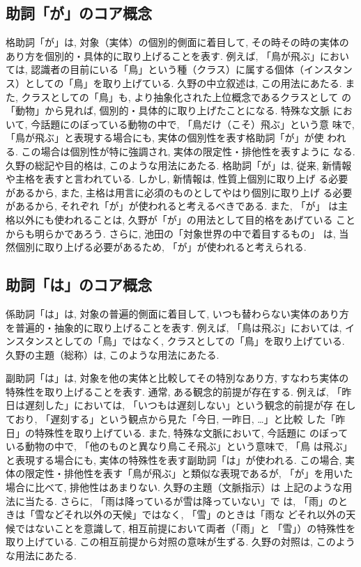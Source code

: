 \subsection{助詞「が」のコア概念}
格助詞「が」は, 対象（実体）の個別的側面に着目して, その時その時の実体の
あり方を個別的・具体的に取り上げることを表す. 例えば, 「鳥が飛ぶ」におい
ては, 認識者の目前にいる「鳥」という種（クラス）に属する個体（インスタン
ス）としての「鳥」を取り上げている. 久野の中立叙述は, この用法にあたる. 
また, クラスとしての「鳥」も, より抽象化された上位概念であるクラスとして
の「動物」から見れば, 個別的・具体的に取り上げたことになる. 特殊な文脈
において, 今話題にのぼっている動物の中で, 「鳥だけ（こそ）飛ぶ」という意
味で, 「鳥が飛ぶ」と表現する場合にも, 実体の個別性を表す格助詞「が」が使
われる. この場合は個別性が特に強調され, 実体の限定性・排他性を表すように
なる. 久野の総記や目的格は, このような用法にあたる. 格助詞「が」は, 従来, 
新情報や主格を表すと言われている. しかし, 新情報は, 性質上個別に取り上げ
る必要があるから, また, 主格は用言に必須のものとしてやはり個別に取り上げ
る必要があるから, それぞれ「が」が使われると考えるべきである. また, 「が」
は主格以外にも使われることは, 久野が「が」の用法として目的格をあげている
ことからも明らかであろう. さらに, 池田の「対象世界の中で着目するもの」
は, 当然個別に取り上げる必要があるため, 「が」が使われると考えられる. 

\subsection{助詞「は」のコア概念}
係助詞「は」は, 対象の普遍的側面に着目して, いつも替わらない実体のあり方
を普遍的・抽象的に取り上げることを表す. 例えば, 「鳥は飛ぶ」においては, 
インスタンスとしての「鳥」ではなく, クラスとしての「鳥」を取り上げている. 
久野の主題（総称）は, このような用法にあたる. 

副助詞「は」は, 対象を他の実体と比較してその特別なあり方, すなわち実体の
特殊性を取り上げることを表す. 通常, ある観念的前提が存在する. 例えば, 
「昨日は遅刻した」においては, 「いつもは遅刻しない」という観念的前提が存
在しており, 「遅刻する」という観点から見た「今日, 一昨日, \ldots」と比較
した「昨日」の特殊性を取り上げている. また, 特殊な文脈において, 今話題に
のぼっている動物の中で, 「他のものと異なり鳥こそ飛ぶ」という意味で, 「鳥
は飛ぶ」と表現する場合にも, 実体の特殊性を表す副助詞「は」が使われる. 
この場合, 実体の限定性・排他性を表す「鳥が飛ぶ」と類似な表現であるが, 
「が」を用いた場合に比べて, 排他性はあまりない. 久野の主題（文脈指示）は
上記のような用法に当たる. さらに, 「雨は降っているが雪は降っていない」で
は, 「雨」のときは「雪などそれ以外の天候」ではなく, 「雪」のときは「雨な
どそれ以外の天候ではないことを意識して, 相互前提において両者（「雨」と
「雪」）の特殊性を取り上げている. この相互前提から対照の意味が生ずる. 
久野の対照は, このような用法にあたる. 


